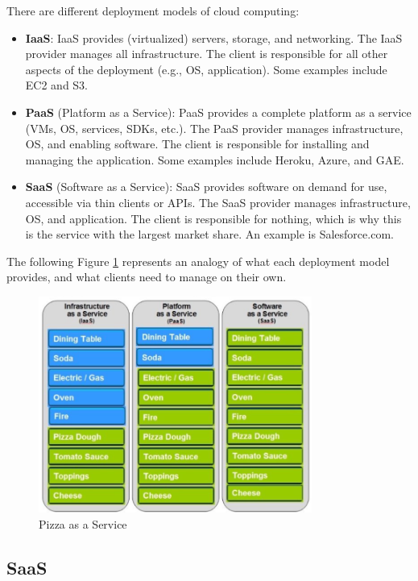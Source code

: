 There are different deployment models of cloud computing:
\begin{itemize}
    \item \textbf{IaaS}: IaaS provides (virtualized) servers, storage, and networking. The IaaS provider manages all infrastructure. The client is responsible for all other aspects of the deployment (e.g., OS, application). Some examples include EC2 and S3.
    \item \textbf{PaaS} (Platform as a Service): PaaS provides a complete platform as a service (VMs, OS, services, SDKs, etc.). The PaaS provider manages infrastructure, OS, and enabling software. The client is responsible for installing and managing the application. Some examples include Heroku, Azure, and GAE.
    \item \textbf{SaaS} (Software as a Service): SaaS provides software on demand for use, accessible via thin clients or APIs. The SaaS provider manages infrastructure, OS, and application. The client is responsible for nothing, which is why this is the service with the largest market share. An example is Salesforce.com.
\end{itemize}

The following Figure \ref{fig:PizzaAsAService} represents an analogy of what each deployment model provides, and what clients need to manage on their own.

\begin{figure}[H]
    \centering
    \includegraphics[width=0.8\textwidth]{images/Cloud/PizzaAsAService.png}
    \caption{Pizza as a Service}
    \label{fig:PizzaAsAService}
\end{figure}

\subsection{SaaS}

